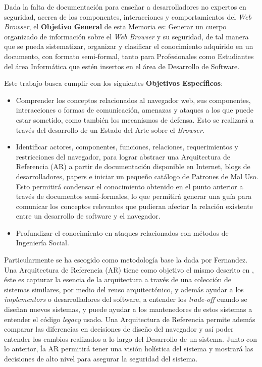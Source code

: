 Dada la falta de documentación para enseñar a desarrolladores no expertos en seguridad, acerca de los componentes, interacciones y comportamientos del \textit{Web Browser}, el \textbf{Objetivo General} de esta Memoria es: Generar un cuerpo organizado de información sobre el \textit{Web Browser} y su seguridad, de tal manera que se pueda sistematizar, organizar y clasificar el conocimiento adquirido en un documento, con formato semi-formal, tanto para Profesionales como Estudiantes del área Informática que estén insertos en el área de Desarrollo de Software.

Este trabajo busca cumplir con los siguientes \textbf{Objetivos Específicos}:

\begin{itemize}
	\item Comprender los conceptos relacionados al navegador web, sus componentes, interacciones o formas de comunicación, amenazas y ataques a los que puede estar sometido, como también los mecanismos de defensa. Esto se realizará a través del desarrollo de un Estado del Arte sobre el \textit{Browser}.
	\item Identificar actores, componentes, funciones, relaciones, requerimientos y restricciones del navegador, para lograr abstraer una Arquitectura de Referencia (AR) a partir de documentación disponible en Internet, blogs de desarrolladores, papers e iniciar un pequeño catálogo de Patrones de Mal Uso. Esto permitirá condensar el conocimiento obtenido en el punto anterior a través de documentos semi-formales, lo que permitirá generar una guía para comunicar los conceptos relevantes que pudieran afectar la relación existente entre un desarrollo de software y el navegador.
	\item Profundizar el conocimiento en ataques relacionados con métodos de Ingeniería Social.
	
\end{itemize} 

Particularmente se ha escogido como metodología base la dada por Fernandez\cite{braz2008eliciting,fernandez2013security}. Una Arquitectura de Referencia (AR) tiene como objetivo el mismo descrito en \cite{2005-grosskurth-browser-refarch, preprint-grosskurth-browser-archevol, Avgeriou2003, Galster2011a}, éste es capturar la esencia de la arquitectura a través de una colección de sistemas similares, por medio del reuso arquitectónico, y además ayudar a los \textit{implementors} o desarrolladores del software, a entender los \textit{trade-off} cuando se diseñan nuevos sistemas, y puede ayudar a los mantenedores de estos sistemas a entender el código \textit{legacy} usado. Una Arquitectura de Referencia permite además comparar las diferencias en decisiones de diseño del navegador y así poder entender los cambios realizados a lo largo del Desarrollo de un sistema. Junto con lo anterior, ĺa AR permitirá tener una visión holística del sistema y mostrará las decisiones de alto nivel para asegurar la seguridad del sistema. 


